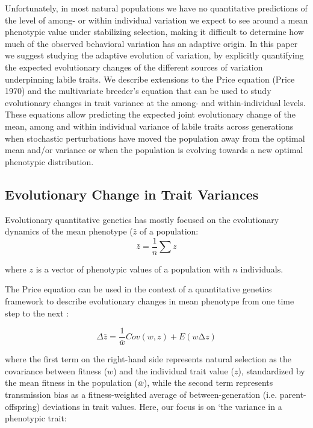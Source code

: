 \documentclass{article}
\begin{document}
Unfortunately, in most natural populations we have no quantitative predictions of the level of among- or within individual variation we expect to see around a mean phenotypic value under stabilizing selection, making it difficult to determine how much of the observed behavioral variation has an adaptive origin. In this paper we suggest studying the adaptive evolution of variation, by explicitly quantifying the expected evolutionary changes of the different sources of variation underpinning labile traits. We describe extensions to the Price equation (Price 1970) and the multivariate breeder’s equation that can be used to study evolutionary changes in trait variance at the among- and within-individual levels. These equations allow predicting the expected joint evolutionary change of the mean, among and within individual variance of labile traits across generations when stochastic perturbations have moved the population away from the optimal mean and/or variance or when the population is evolving towards a new optimal phenotypic distribution. 

\subsection{Evolutionary Change in Trait Variances}

Evolutionary quantitative genetics has mostly focused on the evolutionary dynamics of the mean phenotype ($\bar{z}$ of a population:
\begin{equation} \label{eq:mean}
\bar{z}= \frac{1}{n} \sum{z}
\end{equation}   

where $z$ is a vector of phenotypic values of a population with $n$ individuals.

The Price equation \citep{Price1970} can be used in the context of a quantitative genetics framework to describe evolutionary changes in mean phenotype from one time step to the next :

\begin{equation} \label{eq:Price}
\Delta \bar{z} = \frac{1}{\bar{w}} Cov(w,z)+E(w∆z)
\end{equation}

where the first term on the right-hand side represents natural selection as the covariance between fitness ($w$) and the individual trait value ($z$), standardized by the mean fitness in the population ($\bar{w}$), while the second term represents transmission bias as a fitness-weighted average of between-generation (i.e. parent-offspring) deviations in trait values. Here, our focus is on `the variance in a phenotypic trait:
\end{document}
